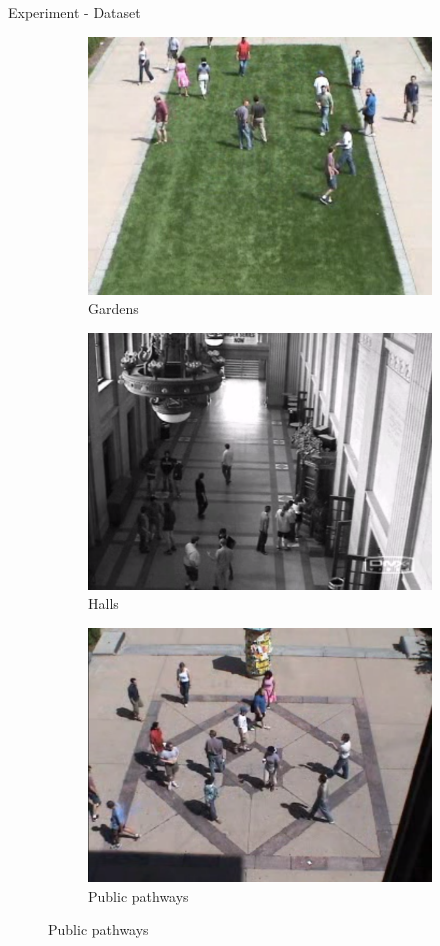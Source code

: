 \documentclass{beamer}
\begin{document}
\begin{frame}{Experiment - Dataset}
\begin{itemize}
\begin{figure}[h]
         	\begin{subfigure}[t]{.3\textwidth}
         		\includegraphics[width=0.8\linewidth]{images/umn_normal1.png}
         		\caption{Gardens}
         	\end{subfigure}\hfill%
         	\begin{subfigure}[t]{.3\textwidth}
         		\includegraphics[width=0.8\linewidth]{images/umn_normal2.png}
         		\caption{Halls}
         		
         	\end{subfigure}\hfill%
         	\begin{subfigure}[t]{.3\textwidth}
         		\centering
         		\includegraphics[width=0.8\linewidth]{images/umn_normal3.png}
         		\caption{Public pathways}
         		

\end{subfigure}
\end{figure}
\end{itemize}
\end{frame}
\end{document}
